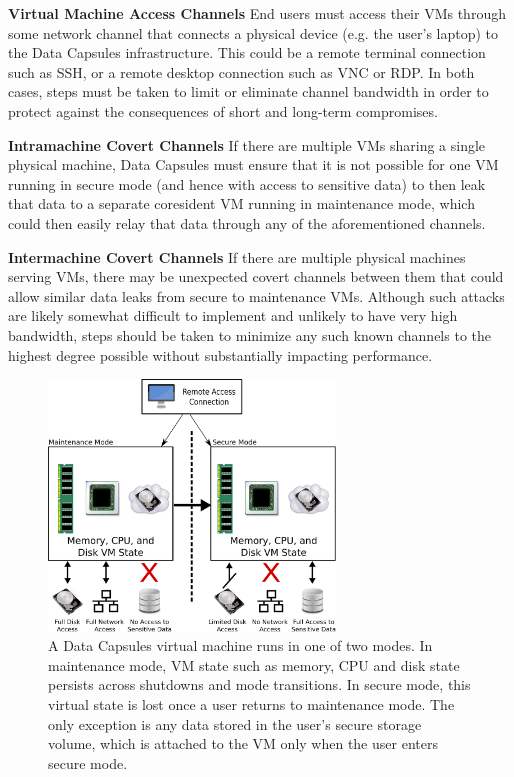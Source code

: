\documentclass{acm_proc_article-sp}
\begin{document}
\textbf{Virtual Machine Access Channels} End users must access their VMs
through some network channel that connects a physical device (e.g. the user's
laptop) to the Data Capsules infrastructure.  This could be a remote terminal
connection such as SSH, or a remote desktop connection such as VNC or RDP.  In
both cases, steps must be taken to limit or eliminate channel bandwidth in order
to protect against the consequences of short and long-term compromises.

\textbf{Intramachine Covert Channels} If there are multiple VMs sharing a
single physical machine, Data Capsules must ensure that it is not possible for
one VM running in secure mode (and hence with access to sensitive data) to then
leak that data to a separate coresident VM running in maintenance mode, which
could then easily relay that data through any of the aforementioned channels.

\textbf{Intermachine Covert Channels} If there are multiple physical machines
serving VMs, there may be unexpected covert channels between them that could
allow similar data leaks from secure to maintenance VMs.  Although such attacks
are likely somewhat difficult to implement and unlikely to have very high
bandwidth, steps should be taken to minimize any such known channels to the
highest degree possible without substantially impacting performance.

\begin{figure}[ht!]
\center
\includegraphics[width=3.0in]{figures/architecture}

\caption{A Data Capsules virtual machine runs in one of two modes.  In
maintenance mode, VM state such as memory, CPU and disk state persists across
shutdowns and mode transitions.  In secure mode, this virtual state is lost
once a user returns to maintenance mode. The only exception is any data stored
in the user's secure storage volume, which is attached to the VM only when the
user enters secure mode.}

\label{fig:architecture}
\end{figure}
\end{document}
